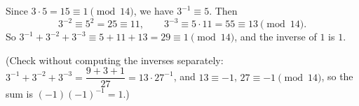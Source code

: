 Since $3\cdot5=15\equiv1\pmod{14}$, we have $3^{-1}\equiv5$. Then
\[
3^{-2}\equiv5^2=25\equiv11,\qquad 3^{-3}\equiv5\cdot11=55\equiv13\pmod{14}.
\]
So $3^{-1}+3^{-2}+3^{-3}\equiv5+11+13=29\equiv1\pmod{14}$, and the inverse of $1$ is $\boxed{1}$.

(Check without computing the inverses separately: $3^{-1}+3^{-2}+3^{-3}=\dfrac{9+3+1}{27}=13\cdot27^{-1}$, and $13\equiv-1$, $27\equiv-1\pmod{14}$, so the sum is $(-1)(-1)^{-1}=1$.)
